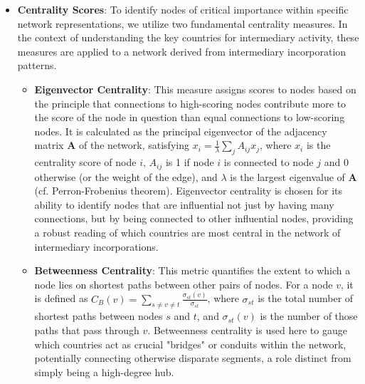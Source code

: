 \begin{itemize}
    \item \textbf{Centrality Scores}: To identify nodes of critical importance within specific network representations, we utilize two fundamental centrality measures. In the context of understanding the key countries for intermediary activity, these measures are applied to a network derived from intermediary incorporation patterns.
    \begin{itemize}
        \item \textbf{Eigenvector Centrality}: This measure assigns scores to nodes based on the principle that connections to high-scoring nodes contribute more to the score of the node in question than equal connections to low-scoring nodes. It is calculated as the principal eigenvector of the adjacency matrix $\mathbf{A}$ of the network, satisfying $x_i = \frac{1}{\lambda} \sum_{j} A_{ij} x_j$, where $x_i$ is the centrality score of node $i$, $A_{ij}$ is 1 if node $i$ is connected to node $j$ and 0 otherwise (or the weight of the edge), and $\lambda$ is the largest eigenvalue of $\mathbf{A}$ (cf. Perron-Frobenius theorem). Eigenvector centrality is chosen for its ability to identify nodes that are influential not just by having many connections, but by being connected to other influential nodes, providing a robust reading of which countries are most central in the network of intermediary incorporations.
        \item \textbf{Betweenness Centrality}: This metric quantifies the extent to which a node lies on shortest paths between other pairs of nodes. For a node $v$, it is defined as $C_B(v) = \sum_{s \neq v \neq t} \frac{\sigma_{st}(v)}{\sigma_{st}}$, where $\sigma_{st}$ is the total number of shortest paths between nodes $s$ and $t$, and $\sigma_{st}(v)$ is the number of those paths that pass through $v$. Betweenness centrality is used here to gauge which countries act as crucial "bridges" or conduits within the network, potentially connecting otherwise disparate segments, a role distinct from simply being a high-degree hub.
    \end{itemize}


\end{itemize}
